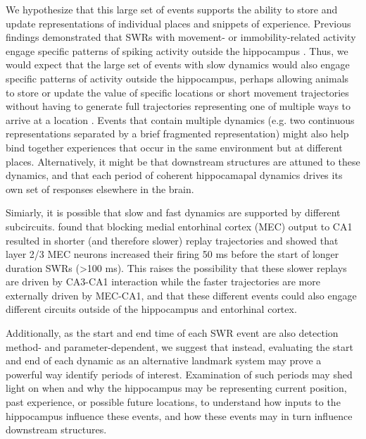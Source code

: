 \documentclass[9pt,lineno]{elife}
\begin{document}
We hypothesize that this large set of events supports the ability to store and update  representations of individual places and snippets of experience. Previous findings demonstrated that SWRs with movement- or immobility-related activity engage specific patterns of spiking activity outside the hippocampus \citep{YuDistincthippocampalcorticalmemory2017, JadhavCoordinatedExcitationInhibition2016}. Thus, we would expect that the large set of events with slow dynamics would also engage specific patterns of activity outside the hippocampus, perhaps allowing animals to store or update the value of specific locations or short movement trajectories without having to generate full trajectories representing one of multiple ways to arrive at a location \citep{YuHippocampalcorticalinteraction2015}. Events that contain multiple dynamics (e.g. two continuous representations separated by a brief fragmented representation) might also help bind together experiences that occur in the same environment but at different places. Alternatively, it might be that downstream structures are attuned to these dynamics, and that each period of coherent hippocamapal dynamics drives its own set of responses elsewhere in the brain.

Simiarly, it is possible that slow and fast dynamics are supported by different subcircuits. \cite{YamamotoDirectMedialEntorhinal2017} found that blocking medial entorhinal cortex (MEC) output to CA1 resulted in shorter (and therefore slower) replay trajectories and \cite{OlivaOriginGammaFrequency2018} showed that layer 2/3 MEC neurons increased their firing 50 ms before the start of longer duration SWRs (>100 ms). This raises the possibility that these slower replays are driven by CA3-CA1 interaction while the faster trajectories are more externally driven by MEC-CA1, and that these different events could also engage different circuits outside of the hippocampus and entorhinal cortex.

Additionally, as the start and end time of each SWR event are also detection method- and parameter-dependent, we suggest that instead, evaluating the start and end of each dynamic as an alternative landmark system may prove a powerful way identify periods of interest. Examination of such periods may shed light on when and why the hippocampus may be representing current position, past experience, or possible future locations, to understand how inputs to the hippocampus influence these events, and how these events may in turn influence downstream structures.
\end{document}
